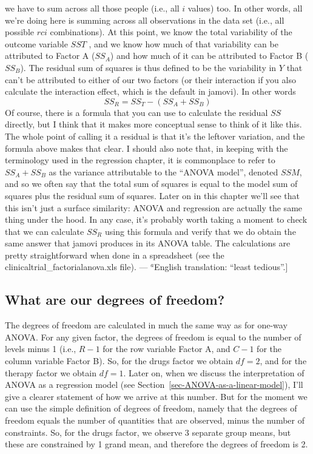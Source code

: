\documentclass[
  a4paper,
]{book}
\begin{document}
{  we have to sum across all those people (i.e., all \(i\) values) too.
  In other words, all we're doing here is summing across all
  observations in the data set (i.e., all possible \(rci\)
  combinations). At this point, we know the total variability of the
  outcome variable \(SST\) , and we know how much of that variability
  can be attributed to Factor A (\(SS_A\)) and how much of it can be
  attributed to Factor B (\(SS_B\)). The residual sum of squares is thus
  defined to be the variability in \(Y\) that can't be attributed to
  either of our two factors (or their interaction if you also calculate
  the interaction effect, which is the default in jamovi). In other
  words \[SS_R=SS_T-(SS_A+SS_B)\] Of course, there is a formula that you
  can use to calculate the residual \(SS\) directly, but I think that it
  makes more conceptual sense to think of it like this. The whole point
  of calling it a residual is that it's the leftover variation, and the
  formula above makes that clear. I should also note that, in keeping
  with the terminology used in the regression chapter, it is commonplace
  to refer to \(SS_A + SS_B\) as the variance attributable to the
  ``ANOVA model'', denoted \(SSM\), and so we often say that the total
  sum of squares is equal to the model sum of squares plus the residual
  sum of squares. Later on in this chapter we'll see that this isn't
  just a surface similarity: ANOVA and regression are actually the same
  thing under the hood. In any case, it's probably worth taking a moment
  to check that we can calculate \(SS_R\) using this formula and verify
  that we do obtain the same answer that jamovi produces in its ANOVA
  table. The calculations are pretty straightforward when done in a
  spreadsheet (see the clinicaltrial\_factorialanova.xls file). ---
  \(^a\)English translation: ``least tedious''.}{]}

\hypertarget{what-are-our-degrees-of-freedom}{%
\subsection{What are our degrees of
freedom?}\label{what-are-our-degrees-of-freedom}}

The degrees of freedom are calculated in much the same way as for
one-way ANOVA. For any given factor, the degrees of freedom is equal to
the number of levels minus 1 (i.e., \(R - 1\) for the row variable
Factor A, and \(C - 1\) for the column variable Factor B). So, for the
drugs factor we obtain \(df = 2\), and for the therapy factor we obtain
\(df = 1\). Later on, when we discuss the interpretation of ANOVA as a
regression model (see Section~\ref{sec-ANOVA-as-a-linear-model}), I'll
give a clearer statement of how we arrive at this number. But for the
moment we can use the simple definition of degrees of freedom, namely
that the degrees of freedom equals the number of quantities that are
observed, minus the number of constraints. So, for the drugs factor, we
observe 3 separate group means, but these are constrained by 1 grand
mean, and therefore the degrees of freedom is 2.
\end{document}
